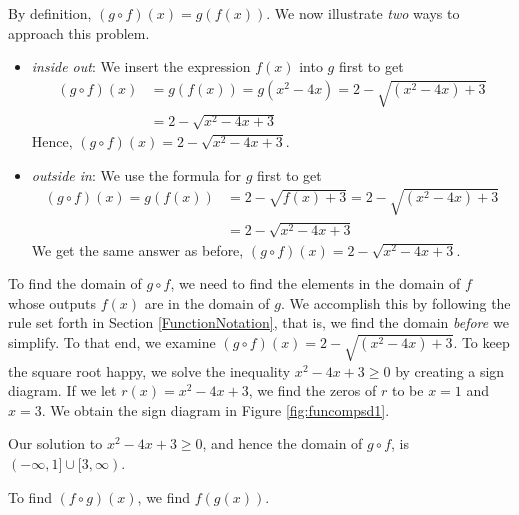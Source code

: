 {
By definition, $(g \circ f)(x) = g(f(x))$. We now illustrate \textit{two} ways to approach this problem.

\begin{itemize}

\item  \textit{inside out}:  We insert the expression $f(x)$ into $g$ first to get  
\begin{align*}
(g \circ f)(x) &= g(f(x)) = g\left(x^2-4x\right) = 2 - \sqrt{\left(x^2-4x\right)+3}\\
& = 2 - \sqrt{x^2-4x+3}
\end{align*}
Hence, $(g \circ f)(x) = 2 - \sqrt{x^2-4x+3}$.

\item  \textit{outside in}:  We use the formula for $g$ first to get  
\begin{align*}
(g \circ f)(x) = g(f(x)) &= 2-\sqrt{f(x)+3} = 2 - \sqrt{\left(x^2-4x\right)+3}\\
& = 2 - \sqrt{x^2-4x+3}
\end{align*}
We get the same answer as before,  $(g \circ f)(x) = 2 - \sqrt{x^2-4x+3}$.

\end{itemize} 

To find the domain of $g \circ f$, we need to find the elements in the domain of $f$ whose outputs $f(x)$ are in the domain of $g$.  We accomplish this by following the rule set forth in Section \ref{FunctionNotation}, that is, we find the domain \textit{before} we simplify.  To that end, we examine $(g \circ f)(x) = 2 - \sqrt{\left(x^2-4x\right)+3}$.  To keep the square root happy, we solve the inequality $x^2-4x+3 \geq 0$ by creating a sign diagram.  If we let $r(x) = x^2-4x+3$, we find the zeros of $r$ to be $x = 1$ and $x = 3$.  We obtain the sign diagram in Figure \ref{fig:funcompsd1}.


Our solution to $x^2-4x+3 \geq 0$, and hence the domain of $g \circ f$, is $(-\infty, 1] \cup [3,\infty)$.

\medskip

To find $(f \circ g)(x)$, we find $f(g(x))$. 

}
